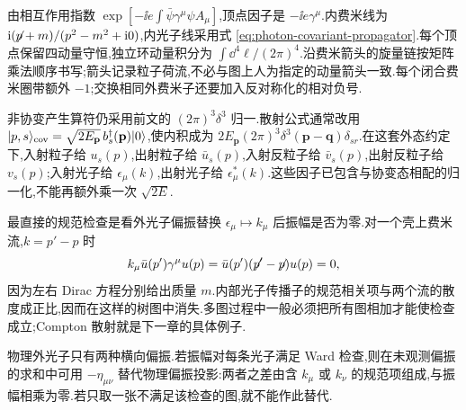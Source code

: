 
由相互作用指数 $\exp[-\ii e\int\bar\psi\gamma^\mu\psi A_\mu]$,顶点因子是 $-\ii e\gamma^\mu$.内费米线为 $\ii(\slashed p+m)/(p^2-m^2+\ii0)$,内光子线采用式 \eqref{eq:photon-covariant-propagator}.每个顶点保留四动量守恒,独立环动量积分为 $\int\dd^4\ell/(2\pi)^4$.沿费米箭头的旋量链按矩阵乘法顺序书写;箭头记录粒子荷流,不必与图上人为指定的动量箭头一致.每个闭合费米圈带额外 $-1$;交换相同外费米子还要加入反对称化的相对负号.

非协变产生算符仍采用前文的 $(2\pi)^3\delta^3$ 归一.散射公式通常改用 $\ket{p,s}_{\rm cov}=\sqrt{2E_{\mathbf p}}\,b_s^\dagger(\mathbf p)\ket0$,使内积成为 $2E_{\mathbf p}(2\pi)^3\delta^3(\mathbf p-\mathbf q)\delta_{sr}$.在这套外态约定下,入射粒子给 $u_s(p)$,出射粒子给 $\bar u_s(p)$,入射反粒子给 $\bar v_s(p)$,出射反粒子给 $v_s(p)$;入射光子给 $\epsilon_\mu(k)$,出射光子给 $\epsilon_\mu^*(k)$.这些因子已包含与协变态相配的归一化,不能再额外乘一次 $\sqrt{2E}$.

最直接的规范检查是看外光子偏振替换 $\epsilon_\mu\mapsto k_\mu$ 后振幅是否为零.对一个壳上费米流,$k=p'-p$ 时
\begin{equation}
 k_\mu\bar u(p')\gamma^\mu u(p)
 =\bar u(p')(\slashed p'-\slashed p)u(p)=0,
\end{equation}
因为左右 Dirac 方程分别给出质量 $m$.内部光子传播子的规范相关项与两个流的散度成正比,因而在这样的树图中消失.多图过程中一般必须把所有图相加才能使检查成立;Compton 散射就是下一章的具体例子.

\begin{remark}
物理外光子只有两种横向偏振.若振幅对每条光子满足 Ward 检查,则在未观测偏振的求和中可用 $-\eta_{\mu\nu}$ 替代物理偏振投影:两者之差由含 $k_\mu$ 或 $k_\nu$ 的规范项组成,与振幅相乘为零.若只取一张不满足该检查的图,就不能作此替代.
\end{remark}
